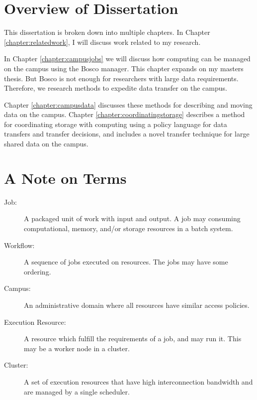\section{Overview of Dissertation}

This dissertation is broken down into multiple chapters.  In Chapter \ref{chapter:relatedwork}, I will discuss work related to my research.  

In Chapter \ref{chapter:campusjobs} we will discuss how computing can be managed on the campus using the Bosco manager.  This chapter expands on my masters thesis.  But Bosco is not enough for researchers with large data requirements.  Therefore, we research methods to expedite data transfer on the campus.   

Chapter \ref{chapter:campusdata} discusses these methods for describing and moving data on the campus.  Chapter \ref{chapter:coordinatingstorage} describes a method for coordinating storage with computing using a policy language for data transfers and transfer decisions, and includes a novel transfer technique for large shared data on the campus.


\newpage
\section{A Note on Terms}

\begin{description}
	\item[Job:] A packaged unit of work with input and output.  A job may consuming computational, memory, and/or storage resources in a batch system.
	\item[Workflow:] A sequence of jobs executed on resources.  The jobs may have some ordering.
	\item[Campus:] An administrative domain where all resources have similar access policies.
	\item[Execution Resource:] A resource which fulfill the requirements of a job, and may run it.  This may be a worker node in a cluster.
	\item[Cluster:] A set of execution resources that have high interconnection bandwidth and are managed by a single scheduler.
\end{description}



